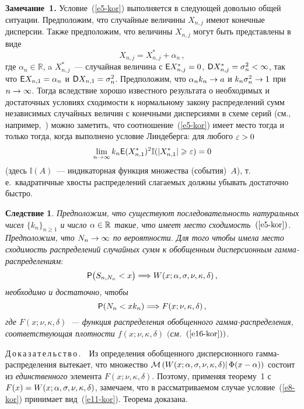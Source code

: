 \begin{multicols}{2}
\smallskip

\noindent
\textbf{Замечание~1.} Условие~(\ref{e5-kor}) выполняется в следующей довольно
общей ситуации. Предположим, что случайные величины $X_{n,j}$ имеют
конечные дисперсии. Также предположим, что величины $X_{n,j}$ могут
быть представлены в виде
$$
X_{n,j}=X_{n,j}^*+\alpha_n\,,
$$
где $\alpha_n\in\mathbb{R}$, a $X_{n,j}^*$~--- случайная величина с
${\sf E} X_{n,j}^*\hm=0$, ${\sf D} X_{n,j}^*\hm=\sigma_n^2<\infty$, так
что ${\sf E} X_{n,1}\hm=\alpha_n$ и ${\sf D} X_{n,1}\hm=\sigma_n^2$.
Предположим, что $\alpha_nk_n\hm\to a$ и $k_n\sigma_n^2\hm\to 1$ при
$n\hm\to\infty$. Тогда вследствие хорошо известного результата о
необходимых и достаточных условиях сходимости к нормальному закону
распределений сумм независимых случайных величин с конечными
дисперсиями в схеме серий (см., например,~\cite{GnedenkoKolmogorov1949}) 
можно заметить, что соотношение~(\ref{e5-kor})
имеет место тогда и только тогда, когда выполнено условие
Линдеберга: для любого $\varepsilon\hm>0$
$$
\lim\limits_{n\to\infty}k_n{\sf E}(X_{n,1}^*)^2\mathbb{I}(|X_{n,1}^*|\geqslant\varepsilon)=0
$$
(здесь $\mathbb{I}(A)$~--- индикаторная функция множества (события)~$A$), 
т.\,е.\ квадратичные хвосты распределений слагаемых должны убывать достаточно \mbox{быстро}.

\smallskip

\noindent
\textbf{Следствие 1}. \textit{Предположим, что существуют
последовательность натуральных чисел $\{k_n\}_{n\geqslant1}$ и число
$\alpha\hm\in\mathbb{R}$ такие, что имеет место сходимость~$(\ref{e5-kor})$.
Предположим, что $N_n\hm\to\infty$ по вероятности. Для того чтобы имела
место сходимость распределений случайных сумм к обобщенным
дисперсионным гам\-ма-рас\-пре\-де\-ле\-ни\-ям$:$
\begin{equation}
{\sf P}\big(S_{n,N_n}<x\big)\Longrightarrow
W(x;\alpha,\sigma,\nu,\kappa,\delta)\,,\label{e10-kor}
\end{equation}
необходимо и достаточно, чтобы
\begin{equation}
{\sf P}(N_n<xk_n)\Longrightarrow F(x;\nu,\kappa,\delta)\,,\label{e11-kor}
\end{equation}
где $F(x;\nu,\kappa,\delta)$~--- функция распределения обобщенного
гам\-ма-распределения, соответствующая плотности
$f(x;\nu,\kappa,\delta)$ $($см.~$(\ref{e16-kor}))$.}

\smallskip

\noindent
Д\,о\,к\,а\,з\,а\,т\,е\,л\,ь\,с\,т\,в\,о\,.\ \  Из определения обобщенного
дисперсионного гам\-ма-рас\-пре\-де\-ле\-ния вытекает, что множество
$\mathcal{M}\left(W(x;\alpha,\sigma,\nu,\kappa,\delta)|\,\Phi(x\hm-\alpha)\right)$
состоит из {\it единственного} элемента $F(x;\nu,\kappa,\delta)$.
Поэтому, применяя теорему~1 с
$F(x)\hm=W(x;\alpha,\sigma,\nu,\kappa,\delta)$, замечаем, что в
рас\-смат\-ри\-ва\-емом случае условие~(\ref{e8-kor}) принимает вид~(\ref{e11-kor}). Теорема
доказана.


\end{multicols}
